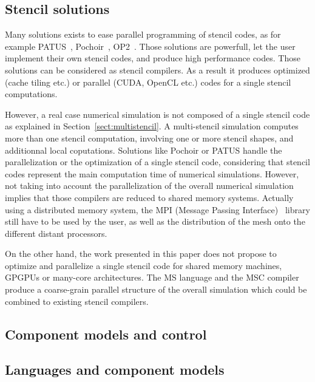 \subsection{Stencil solutions}

Many solutions exists to ease parallel programming of stencil codes, as for example PATUS~\cite{citeulike12258902}, Pochoir~\cite{spaaTangCKLL11}, OP2~\cite{Giles2011}. Those solutions are powerfull, let the user implement their own stencil codes, and produce high performance codes. Those solutions can be considered as stencil compilers. As a result it produces optimized (cache tiling etc.) or parallel (CUDA, OpenCL etc.) codes for a single stencil computations. 

However, a real case numerical simulation is not composed of a single stencil code as explained in Section~\ref{sect:multistencil}. A multi-stencil simulation computes more than one stencil computation, involving one or more stencil shapes, and additionnal local coputations. Solutions like Pochoir or PATUS handle the parallelization or the optimization of a single stencil code, considering that stencil codes represent the main computation time of numerical simulations. However, not taking into account the parallelization of the overall numerical simulation implies that those compilers are reduced to shared memory systems. Actually using a distributed memory system, the MPI (Message Passing Interface)~\cite{Graham2009MSE} library still have to be used by the user, as well as the distribution of the mesh onto the different distant processors.

On the other hand, the work presented in this paper does not propose to optimize and parallelize a single stencil code for shared memory machines, GPGPUs or many-core architectures. The MS language and the MSC compiler produce a coarse-grain parallel structure of the overall simulation which could be combined to existing stencil compilers.

\subsection{Component models and control}

\subsection{Languages and component models}
